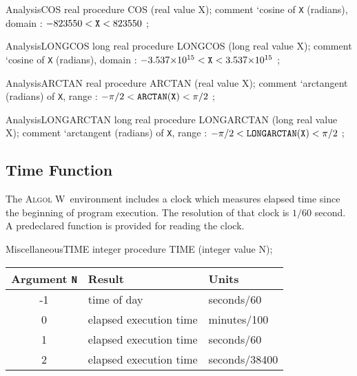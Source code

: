 \documentclass[a4paper]{article}
\def\ALGOLW{\textsc{Algol W}}
\def\A{\lstinline[language=AlgolW,style=ReferenceManual]}
\begin{document}
\begin{ProcedureDeclaration}{Analysis}{COS}
real procedure COS (real value X);
comment `\rm cosine of {\tt X} (radians), domain : $-823550 < {\tt X} < 823550$ ;
\end{ProcedureDeclaration}

\begin{ProcedureDeclaration}{Analysis}{LONGCOS}
long real procedure LONGCOS (long real value X);
comment `\rm cosine of {\tt X} (radians), domain : $-3.537{\times}10^{15} < {\tt X} < 3.537{\times}10^{15}$ ;
\end{ProcedureDeclaration}

\begin{ProcedureDeclaration}{Analysis}{ARCTAN}
real procedure ARCTAN (real value X);
comment `\rm arctangent (radians) of {\tt X}, range : $-\pi/2 < {\tt ARCTAN(X)} < \pi/2$ ;
\end{ProcedureDeclaration}

\begin{ProcedureDeclaration}{Analysis}{LONGARCTAN}
long real procedure LONGARCTAN (long real value X);
comment `\rm arctangent (radians) of {\tt X}, range : $-\pi/2 < {\tt LONGARCTAN(X)} < \pi/2$ ;
\end{ProcedureDeclaration}


\subsection{Time Function}
\label{Time Function}

The \ALGOLW\ environment includes a clock which measures elapsed time
since the beginning of program execution. The resolution of that clock
is $1/60$ second. A predeclared function is provided for reading the
clock.

\begin{ProcedureDeclaration}{Miscellaneous}{TIME}
integer procedure TIME (integer value N);
\end{ProcedureDeclaration}

\begin{tabular}{c|ll}
Argument \A!N! & Result & Units \\
\hline
 -1 & time of day & seconds/60 \\
 0 & elapsed execution time & minutes/100 \\
 1 & elapsed execution time & seconds/60 \\
 2 & elapsed execution time & seconds/38400
\end{tabular}
\\
\end{document}
